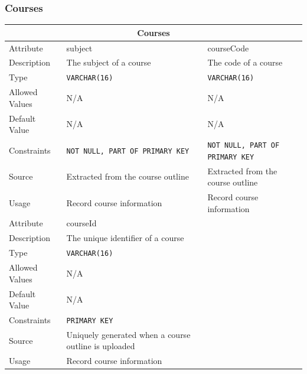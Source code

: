 \documentclass[12pt]{article}
\begin{document}
\subsubsection{Courses}
\begin{longtable}{ |p{3cm}|p{5cm}|p{5cm}|  }
\hline
\multicolumn{3}{|c|}{Courses} \\
\hline
Attribute & subject & courseCode\\
\hline
Description & The subject of a course& The code of a course\\
\hline
Type & \texttt{VARCHAR(16)}& \texttt{VARCHAR(16)}\\
\hline
Allowed Values &N/A &N/A\\
\hline
Default Value &N/A &N/A\\
\hline
Constraints & \texttt{NOT NULL, PART OF PRIMARY KEY}& \texttt{NOT NULL, PART OF PRIMARY KEY}\\
\hline
Source & Extracted from the course outline & Extracted from the course outline\\
\hline
Usage & Record course information & Record course information\\
\hline
Attribute & courseId&\\
\hline
Description & The unique identifier of a course&\\
\hline
Type & \texttt{VARCHAR(16)}&\\
\hline
Allowed Values & N/A&\\
\hline
Default Value &N/A &\\
\hline
Constraints & \texttt{PRIMARY KEY}&\\
\hline
Source & Uniquely generated when a course outline is uploaded&\\
\hline
Usage & Record course information &\\
\hline
\end{longtable}
\end{document}
